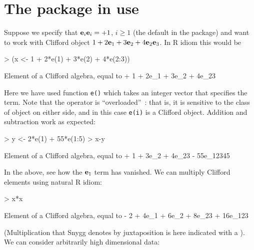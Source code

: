 \documentclass{birkjour}
\theoremstyle{definition}
\theoremstyle{remark}
\numberwithin{equation}{section}
\renewenvironment{Schunk}{\vspace{20pt}}{\vspace{20pt}}
\begin{document}
\section{The package in use}

Suppose we specify that ${\bf e}_{i}{\bf e}_{i}=+1$,
  $i\geqslant 1$ (the default in the package) and want to work with
Clifford object $1+2{\bf e}_{1}+3{\bf e}_{2}+4{\bf e}_{2}{\bf e}_{3}$.  In R idiom this
would be

\begin{Schunk}
\begin{Sinput}
> (x <- 1 + 2*e(1) + 3*e(2) + 4*e(2:3))
\end{Sinput}
\begin{Soutput}
Element of a Clifford algebra, equal to
+ 1 + 2e_1 + 3e_2 + 4e_23
\end{Soutput}
\end{Schunk}
%
Here we have used function {\tt e()} which takes an integer vector
that specifies the term.  Note that the {\tt *}
  operator is ``overloaded''~\cite{stroustrup2013}: that is, it is
  sensitive to the class of object on either side, and in this case
  {\tt e(i)} is a Clifford object.  Addition and subtraction work as
expected:
%
\begin{Schunk}
\begin{Sinput}
> y <- 2*e(1) + 55*e(1:5)
> x-y
\end{Sinput}
\begin{Soutput}
Element of a Clifford algebra, equal to
+ 1 + 3e_2 + 4e_23 - 55e_12345
\end{Soutput}
\end{Schunk}
%
In the above, see how the ${\bf e}_{1}$ term has vanished.  We can
multiply Clifford elements using natural R idiom:

\begin{Schunk}
\begin{Sinput}
> x*x
\end{Sinput}
\begin{Soutput}
Element of a Clifford algebra, equal to
- 2 + 4e_1 + 6e_2 + 8e_23 + 16e_123
\end{Soutput}
\end{Schunk}
%
(Multiplication that Snygg denotes by juxtaposition is here indicated
with a {\tt *}).  We can consider arbitrarily high dimensional data:
\end{document}
